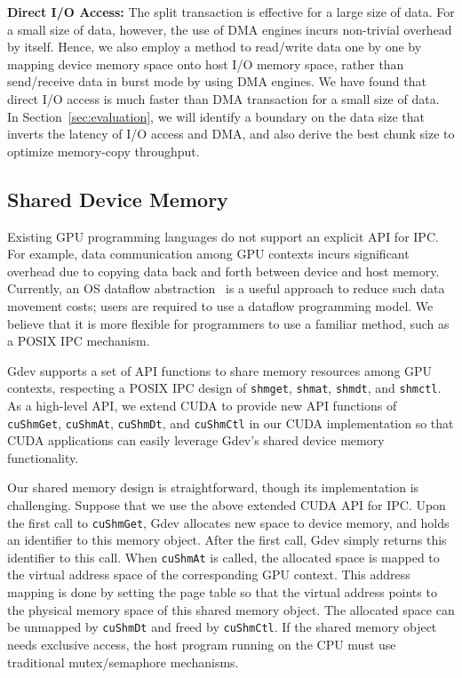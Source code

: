 \textbf{Direct I/O Access:}
The split transaction is effective for a large size of data.
For a small size of data, however, the use of DMA engines incurs
non-trivial overhead by itself.
Hence, we also employ a method to read/write data one by one by mapping
device memory space onto host I/O memory space, rather than send/receive
data in burst mode by using DMA engines.
We have found that direct I/O access is much faster than DMA transaction
for a small size of data.
In Section~\ref{sec:evaluation}, we will identify a boundary on the data
size that inverts the latency of I/O access and DMA, and also derive the
best chunk size to optimize memory-copy throughput.

\vspace{-0.25em}
\subsection{Shared Device Memory}
\label{sec:shared_memory}
\vspace{-0.25em}

Existing GPU programming languages do not support an explicit API
for IPC.
For example, data communication among GPU contexts incurs significant
overhead due to copying data back and forth between device and host
memory.
Currently, an OS dataflow abstraction~\cite{Rossbach_SOSP11} is a useful
approach to reduce such data movement costs; users are required to use a
dataflow programming model.
We believe that it is more flexible for programmers to
use a familiar method, such as a POSIX IPC mechanism.

Gdev supports a set of API functions to share memory resources among GPU
contexts, respecting a POSIX IPC design of \texttt{shmget},
\texttt{shmat}, \texttt{shmdt}, and \texttt{shmctl}.
As a high-level API, we extend CUDA  to provide new API functions of
\texttt{cuShmGet}, \texttt{cuShmAt}, \texttt{cuShmDt}, and
\texttt{cuShmCtl} in our CUDA implementation so that CUDA
applications can easily leverage Gdev's shared device memory
functionality.

Our shared memory design is straightforward, though its implementation
is challenging.
Suppose that we use the above extended CUDA API for IPC.
Upon the first call to \texttt{cuShmGet}, Gdev allocates new space to
device memory, and holds an identifier to this memory object. 
After the first call, Gdev simply returns this identifier to this call.
When \texttt{cuShmAt} is called, the allocated space is mapped to the
virtual address space of the corresponding GPU context.
This address mapping is done by setting the page table so that the
virtual address points to the physical memory space of this shared
memory object.
The allocated space can be unmapped by \texttt{cuShmDt} and freed by
\texttt{cuShmCtl}. 
If the shared memory object needs exclusive access, the host program
running on the CPU must use traditional mutex/semaphore mechanisms.

